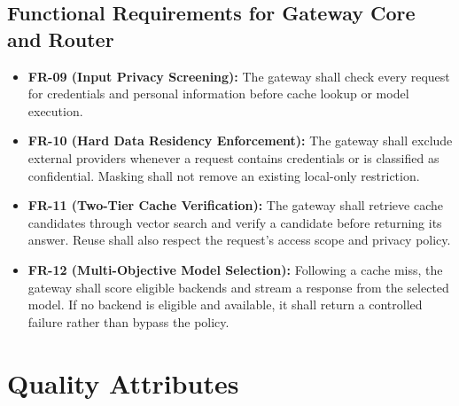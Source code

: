 \subsection{Functional Requirements for Gateway Core and Router}
\begin{itemize}
    \item \textbf{FR-09 (Input Privacy Screening):} The gateway shall check every request for credentials and personal information before cache lookup or model execution.
    \item \textbf{FR-10 (Hard Data Residency Enforcement):} The gateway shall exclude external providers whenever a request contains credentials or is classified as confidential. Masking shall not remove an existing local-only restriction.
    \item \textbf{FR-11 (Two-Tier Cache Verification):} The gateway shall retrieve cache candidates through vector search and verify a candidate before returning its answer. Reuse shall also respect the request's access scope and privacy policy.
    \item \textbf{FR-12 (Multi-Objective Model Selection):} Following a cache miss, the gateway shall score eligible backends and stream a response from the selected model. If no backend is eligible and available, it shall return a controlled failure rather than bypass the policy.
\end{itemize}

\section{Quality Attributes}
\label{sec:quality-attributes}

